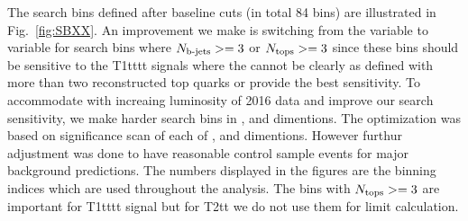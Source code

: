 The search bins defined after baseline cuts (in total 84 bins) are illustrated in Fig.~\ref{fig:SBXX}. An improvement we make is switching from the \MTTwo variable to \HT variable for search bins where $N_{\text{b-jets}}>=3$ or $N_{\text{tops}}>=3$ since these bins should be sensitive to the T1tttt signals where the \MTTwo cannot be clearly as defined with more than two reconstructed top quarks or provide the best sensitivity. 
To accommodate with increaing luminosity of 2016 data and improve our search sensitivity, we make harder search bins in
\MET, \HT and \MTTwo dimentions. The optimization was based on significance scan of each of \MET, \MTTwo and \HT dimentions. However
furthur adjustment was done to have reasonable control sample events for major background predictions.
The numbers displayed in the figures are the binning indices which are used throughout the analysis.
The bins with $N_{\text{tops}}>=3$ are important for T1tttt signal but for T2tt we do not use them for limit calculation.

